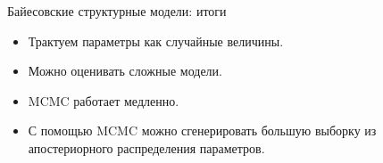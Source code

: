 \begin{frame}{Байесовские структурные модели: итоги}

  \begin{itemize}[<+->]
    \item Трактуем параметры как \alert{случайные величины}. 
    \item Можно оценивать \alert{сложные модели}.
    \item MCMC работает \alert{медленно}.
    \item С помощью MCMC можно сгенерировать большую выборку 
    из \alert{апостериорного} распределения параметров. 
  \end{itemize}
\end{frame}

